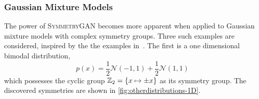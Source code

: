             \subsubsection{Gaussian Mixture Models}
                The power of \textsc{SymmetryGAN} becomes more apparent when applied to Gaussian mixture models with complex symmetry groups.
                Three such examples are considered, inspired by the the examples in~\cite{fisher_boltzmann_2018}.
                The first is a one dimensional bimodal distribution,
                \[
                    p(x) = \frac{1}{2} \mathcal{N}(-1, 1) + \frac{1}{2} \mathcal{N}(1, 1)
                \]
                which possesses the cyclic group \(\mathbb{Z}_2 = \qty{x \mapsto \pm x}\) as its symmetry group.
                The discovered symmetries are shown in \cref{fig:otherdistributions-1D}.
